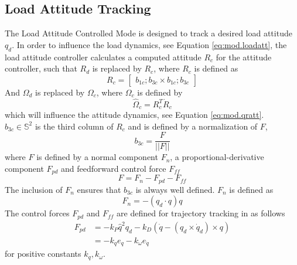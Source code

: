 \subsection{Load Attitude Tracking}\label{sec:con.loadatt}
The Load Attitude Controlled Mode is designed to track a desired load attitude $ q_d $.
In order to influence the load dynamics, see Equation \ref{eq:mod.loadatt}, the load attitude controller calculates a computed  attitude $ R_c $ for the  attitude controller, such that
$ R_d $ is replaced by $ R_c $, where $ R_c $ is defined as
\begin{equation}\label{eq:con.R}
R_c = \begin{bmatrix}
b_{1c}; b_{3c}\times b_{1c};b_{3c}
\end{bmatrix}
\end{equation}
And $ \Omega_d $ is replaced by $ \Omega_c $, where $ \Omega_c $ is defined by
\begin{equation}\label{key}
\hat{\Omega}_c=R_c^T\dot{R}_c
\end{equation}
which will influence the  attitude dynamics, see Equation \ref{eq:mod.qratt}.\\
$ b_{3c} \in \mathbb{S}^2 $ is the third column of $ R_c $ and is defined by a normalization of $ F $,
\begin{equation}\label{eq:con.b3c}
b_{3c}=\frac{F}{||F||}
\end{equation}
where $F $ is defined by a normal component $ F_n $, a proportional-derivative component $ F_{pd} $ and feedforward control force $ F_{ff}$
\begin{equation}\label{eq:con.F}
F=F_n-F_{pd}-F_{ff}
\end{equation}
The inclusion of $ F_n $ ensures that $ b_{3c} $ is always well defined. $ F_n $ is defined as
\begin{equation}\label{eq:con.Fn}
F_n=-(q_d\cdot q)q
\end{equation}
The control forces $ F_{pd} $ and $ F_{ff} $ are defined for trajectory tracking in \cite[11.2.5]{Bullo2005} as follows
\begin{equation}\label{key}
\begin{aligned}
F_{pd}&=-k_P\hat{q}^2q_d-k_D(\dot{q}-(q_d\times\dot{q}_d)\times q)\\
&=-k_qe_q-k_\omega e_{\dot{q}}
\end{aligned}
\end{equation}
for positive constants $ k_q, k_\omega $.\\
